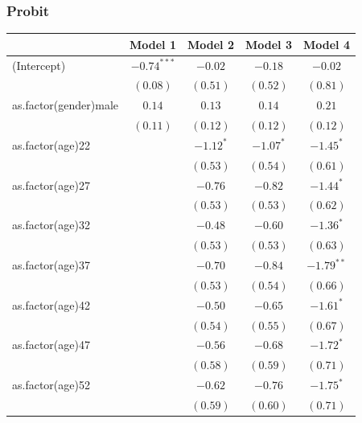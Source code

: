 \documentclass{beamer}
\newcommand{\1}{\mathbb{1}}
\begin{document}
\begin{frame}\frametitle{Probit}
\begin{table}[hb!]
\tiny
\begin{center}
\begin{tabular}{l c c c c }
\toprule
 & Model 1 & Model 2 & Model 3 & Model 4 \\
\midrule
(Intercept)                  & $-0.74^{***}$ & $-0.02$     & $-0.18$     & $-0.02$      \\
                             & $(0.08)$      & $(0.51)$    & $(0.52)$    & $(0.81)$     \\
as.factor(gender)male        & $0.14$        & $0.13$      & $0.14$      & $0.21$       \\
                             & $(0.11)$      & $(0.12)$    & $(0.12)$    & $(0.12)$     \\
as.factor(age)22             &               & $-1.12^{*}$ & $-1.07^{*}$ & $-1.45^{*}$  \\
                             &               & $(0.53)$    & $(0.54)$    & $(0.61)$     \\
as.factor(age)27             &               & $-0.76$     & $-0.82$     & $-1.44^{*}$  \\
                             &               & $(0.53)$    & $(0.53)$    & $(0.62)$     \\
as.factor(age)32             &               & $-0.48$     & $-0.60$     & $-1.36^{*}$  \\
                             &               & $(0.53)$    & $(0.53)$    & $(0.63)$     \\
as.factor(age)37             &               & $-0.70$     & $-0.84$     & $-1.79^{**}$ \\
                             &               & $(0.53)$    & $(0.54)$    & $(0.66)$     \\
as.factor(age)42             &               & $-0.50$     & $-0.65$     & $-1.61^{*}$  \\
                             &               & $(0.54)$    & $(0.55)$    & $(0.67)$     \\
as.factor(age)47             &               & $-0.56$     & $-0.68$     & $-1.72^{*}$  \\
                             &               & $(0.58)$    & $(0.59)$    & $(0.71)$     \\
as.factor(age)52             &               & $-0.62$     & $-0.76$     & $-1.75^{*}$  \\
                             &               & $(0.59)$    & $(0.60)$    & $(0.71)$     \\

\end{tabular}
\end{center}
\end{table}
\end{frame}
\end{document}
